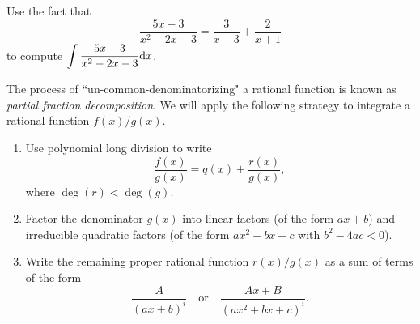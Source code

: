 

\begin{example}
Use the fact that
\begin{equation*}
\frac{5x-3}{x^2-2x-3} = \frac{3}{x-3} + \frac{2}{x+1}
\end{equation*}
to compute $\displaystyle \int\frac{5x-3}{x^2-2x-3} \mathrm{d} x$.
\end{example}
\ifdefined\SOLUTION
{}
\else
\fi

\vfill
\begin{remark}
The process of ``un-common-denominatorizing" a rational function is known as \textit{partial fraction decomposition}.
We will apply the following strategy to integrate a rational function $f(x)/g(x)$.
\begin{enumerate}
\item Use polynomial long division to write 
\begin{equation*}
\frac{f(x)}{g(x)} = q(x) + \frac{r(x)}{g(x)},
\end{equation*}
where $\deg(r)<\deg(g)$.
\item Factor the denominator $g(x)$ into linear factors (of the form $ax+b$) and irreducible quadratic factors (of the form $ax^2+bx+c$ with $b^2-4ac<0$).
\item Write the remaining proper rational function $r(x)/g(x)$ as a sum of terms of the form
\begin{equation*}
\frac{A}{(ax+b)^i}\quad\text{or}\quad\frac{Ax+B}{(ax^2+bx+c)^i}.
\end{equation*}
\end{enumerate}
\end{remark}

\newpage

